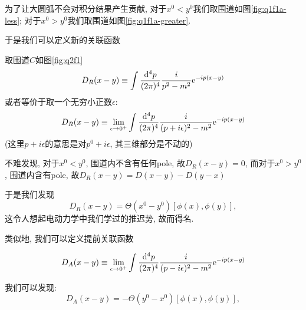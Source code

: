 为了让大圆弧不会对积分结果产生贡献, 对于$x^0<y^0$我们取围道如图\ref{fig:q1f1a-less}; 对于$x^0>y^0$我们取围道如图\ref{fig:q1f1a-greater}.

于是我们可以定义新的关联函数
\begin{theorem}[推迟关联函数$D_R(x-y)$]
    取围道$C$如图\ref{fig:q2f1}
    \begin{equation}
        D_R(x-y)\equiv\int\frac{\mathrm d^4p}{(2\pi)^4} \frac i{p^2-m^2}\mathrm e^{-ip(x-y)}\label{q2eq3}
    \end{equation}
    或者等价于取一个无穷小正数$\epsilon$:
    \begin{equation}
        D_R(x-y)\equiv\lim_{\epsilon\rightarrow0^+}\int\frac{\mathrm d^4p}{(2\pi)^4} \frac i{(p+i\epsilon)^2-m^2}\mathrm e^{-ip(x-y)}
    \end{equation}
    (这里$p+i\epsilon$的意思是对$p^0+i\epsilon$, 其三维部分是不动的)
\end{theorem}
不难发现, 对于$x^0<y^0$, 围道内不含有任何pole, 故$D_R(x-y)=0$, 而对于$x^0>y^0$, 围道内含有pole, 故$D_R(x-y)=D(x-y)-D(y-x)$

于是我们发现
\begin{equation}
    D_R(x-y)=\Theta(x^0-y^0)[\phi(x), \phi(y)],
\end{equation}
这令人想起电动力学中我们学过的推迟势, 故而得名.

类似地, 我们可以定义提前关联函数
\begin{theorem}[提前关联函数$D_A(x-y)$]
    \begin{equation}
        D_A(x-y)\equiv\lim_{\epsilon\rightarrow0^+}\int\frac{\mathrm d^4p}{(2\pi)^4} \frac i{(p-i\epsilon)^2-m^2}\mathrm e^{-ip(x-y)}\label{q2eq4}
    \end{equation}
\end{theorem}
我们可以发现:
\begin{equation}
    D_A(x-y)=-\Theta(y^0-x^0)[\phi(x), \phi(y)],
\end{equation}

